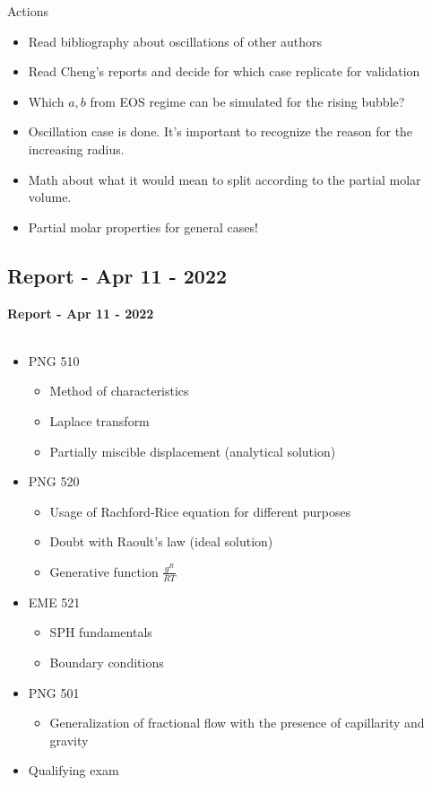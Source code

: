 \documentclass[8pt]{beamer}
\begin{document}
	\begin{frame}{Actions}
		\begin{itemize}
			\item Read bibliography about oscillations of other authors
			\item Read Cheng's reports and decide for which case replicate for validation
			\item Which $a,b$ from EOS regime can be simulated for the rising bubble?
			\item Oscillation case is done. It's important to recognize the reason for the increasing radius.
			\item Math about what it would mean to split according to the partial molar volume. 
			\item Partial molar properties for general cases!
			
		\end{itemize}
	\end{frame}
	
	\subsection{Report - Apr 11 - 2022}
	\label{}
	\justifying
	\begin{frame}{}
		\textbf{Report - Apr 11 - 2022}\\~\\
		\begin{itemize}
			\item PNG 510
			\begin{itemize}
				\item Method of characteristics
				\item Laplace transform
				\item Partially miscible displacement (analytical solution)
			\end{itemize}
			\item PNG 520
			\begin{itemize}
				\item Usage of Rachford-Rice equation for different purposes
				\item Doubt with Raoult's law (ideal solution)
				\item Generative function $\frac{g^R}{RT}$
			\end{itemize}
			\item EME 521
			\begin{itemize}
				\item SPH fundamentals 
				\item Boundary conditions
			\end{itemize}
			\item PNG 501
			\begin{itemize}
				\item Generalization of fractional flow with the presence of capillarity and gravity
			\end{itemize}
			\item Qualifying exam
		\end{itemize}
	\end{frame}
\end{document}
